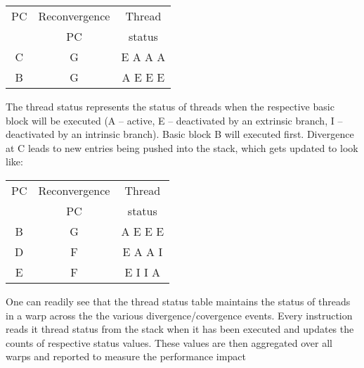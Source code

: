 \begin{center}
\begin{tabular}{|c|c|c|}
		\hline
		PC	& Reconvergence	&	Thread	\\	
		  	&	PC	&	status	\\
		\hline
		C	&		G&		E A A A \\
		B	&		G&		A E E E \\
		\hline
\end{tabular}
\end{center}

The thread status represents the status of threads when the respective basic block will be executed (A -- active, E -- deactivated by an extrinsic branch, I -- deactivated by an intrinsic branch). Basic block B will  executed first. Divergence at C leads to new entries being pushed into the stack, which gets updated to look like:

\begin{center}
\begin{tabular}{|c|c|c|}
		\hline
		PC	& Reconvergence	&	Thread	\\	
		  	&	PC	&	status	\\
		\hline
		B	&		G&		A E E E \\
		D	&		F&		E A A I \\
		E	&		F&		E I I A \\
		\hline
\end{tabular}
\end{center}

\par{One can readily see that the thread status table maintains the status of threads in a warp across the the various divergence/covergence events. Every instruction reads it thread status from the stack when it has been executed and updates the counts of respective status values. These values are then aggregated over all warps and reported to measure the performance impact}
